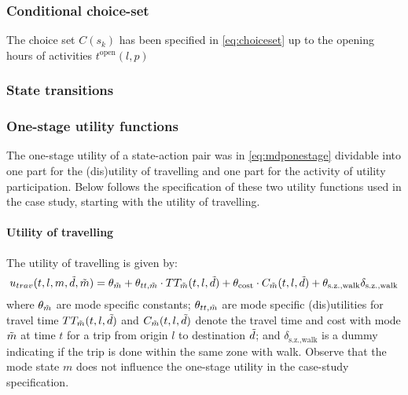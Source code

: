 \subsubsection{Conditional choice-set}
The choice set $C(s_k)$ has been specified in \eqref{eq:choiceset} up to the opening hours of activities $t^{\text{open}}({l,p})$


\subsubsection{State transitions}

\subsubsection{One-stage utility functions}
\newcommand{\cost}{\text{cost}}
\newcommand{\car}{\text{car}}
\newcommand{\pt}{\text{PT}}
\newcommand{\walk}{\text{walk}}
\newcommand{\bike}{\text{bike}}
\newcommand{\dummy}[1]{\delta_{#1}}
\newcommand{\hi}{\text{h.i}}
\newcommand{\wait}{\text{wait}}
\newcommand{\geqfive}{\text{s.z.,walk}}
\newcommand{\mc}{\theta}
\newcommand{\ac}{\theta}
\newcommand{\dura}[1]{\Delta t_#1}
\newcommand{\TT}{TT}

The one-stage utility of a state-action pair was in \eqref{eq:mdponestage} dividable into one part for the (dis)utility of travelling and one part for the activity of utility participation. Below follows the specification of these two utility functions used in the case study, starting with the utility of travelling.
\paragraph{Utility of travelling}
The utility of travelling is given by:
\begin{equation}
u_{trav}(t,l,m,\act{d},\act{m}) = \mc_{\act{m}} + \theta_{tt,\act{m}} \cdot \TT_{\act{m}}(t,l,\act{d}) + \theta_{\cost} \cdot C_{\act{m}}(t,l,\act{d}) +\theta_{\geqfive} \dummy{\geqfive}
\end{equation}
where $\mc_{\act{m}}$ are mode specific constants; $\theta_{tt,\tilde{m}}$ are mode specific (dis)utilities for travel time  $\TT_{\act{m}}(t,l,\act{d})$ and $C_{\tilde{m}}(t,l,\tilde{d})$ denote the travel time and cost with mode $\tilde{m}$ at time $t$ for a trip from origin $l$ to destination $\tilde{d}$; and $\dummy{\geqfive}$ is a dummy indicating if the trip is done within the same zone with walk. Observe that the mode state $m$ does not influence the one-stage utility in the case-study specification.

